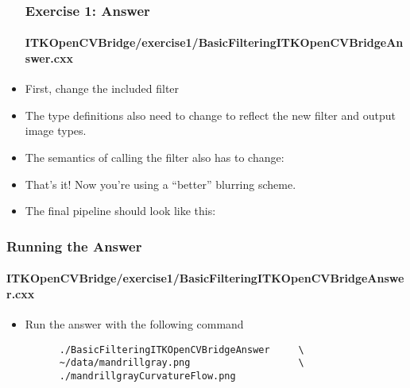 \begin{frame}
\begin{itemize}
\frametitle{Exercise 1: Answer}
\framesubtitle{ITKOpenCVBridge/exercise1/BasicFilteringITKOpenCVBridgeAnswer.cxx}
\item First, change the included filter
\pause
\item The type definitions also need to change to reflect the new
  filter and output image types.
\end{itemize}
\end{frame}

\begin{frame}
\begin{itemize}
\frametitle{Exercise 1: Answer}
\framesubtitle{ITKOpenCVBridge/exercise1/BasicFilteringITKOpenCVBridgeAnswer.cxx}
\item The semantics of calling the filter also has to change:
\pause
\item That's it! Now you're using a ``better'' blurring scheme.
\end{itemize}
\end{frame}

\begin{frame}
\begin{itemize}
\frametitle{Exercise 1: Answer}
\framesubtitle{ITKOpenCVBridge/exercise1/BasicFilteringITKOpenCVBridgeAnswer.cxx}
\item The final pipeline should look like this:
\end{itemize}
\end{frame}

\begin{frame}[fragile]
\frametitle{Running the Answer}
\framesubtitle{ITKOpenCVBridge/exercise1/BasicFilteringITKOpenCVBridgeAnswer.cxx}
\begin{itemize}
\item Run the answer with the following command
\begin{verbatim}
      ./BasicFilteringITKOpenCVBridgeAnswer     \
      ~/data/mandrillgray.png                   \
      ./mandrillgrayCurvatureFlow.png 
\end{verbatim}
\end{itemize}
\end{frame}

